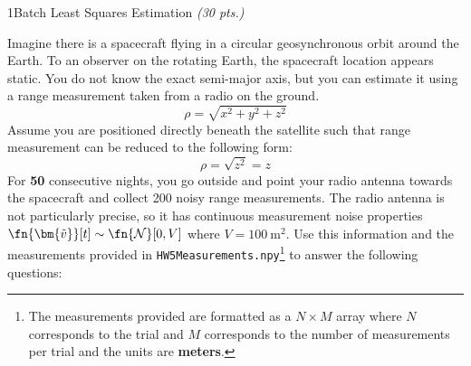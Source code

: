 \begin{hwkProblem}{1}{Batch Least Squares Estimation \textit{(30 pts.)}} \label{hwk:p01}

	Imagine there is a spacecraft flying in a circular geosynchronous orbit around the Earth. To an observer on the rotating Earth, the spacecraft location appears static. You do not know the exact semi-major axis, but you can estimate it using a range measurement taken from a radio on the ground.
	\[
		\rho = \sqrt{x^{2} + y^{2} + z^{2}}
	\]
	Assume you are positioned directly beneath the satellite such that range measurement can be reduced to the following form:
	\[
		\rho = \sqrt{z^{2}} = z
	\]
	For \textbf{50} consecutive nights, you go outside and point your radio antenna towards the spacecraft and collect 200 noisy range measurements. The radio antenna is not particularly precise, so it has continuous measurement noise properties \( \fn{\bm{\tilde{v}}}[t] \sim \fn{\mathcal{N}}[0, V] \) where \( V = \qty{100}{\m\squared} \). Use this information and the measurements provided in \texttt{HW5Measurements.npy}\footnote{The measurements provided are formatted as a \( N \times M \) array where \( N \) corresponds to the trial and \( M \) corresponds to the number of measurements per trial and the units are \textbf{meters}.} to answer the following questions:


\end{hwkProblem}
